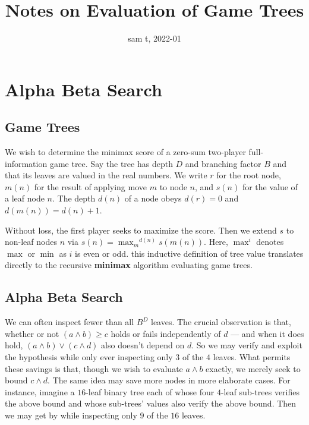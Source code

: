 \documentclass[12pt]{article}
\title{Notes on Evaluation of Game Trees}
\author{sam t, 2022-01}
\date{}
\begin{document}
  \maketitle

  \section{Alpha Beta Search}

    \subsection{Game Trees}

      We wish to determine the minimax score of a zero-sum two-player
      full-information game tree.  Say the tree has depth $D$ and branching
      factor $B$ and that its leaves are valued in the real numbers.  We write
      $r$ for the root node, $m(n)$ for the result of applying move $m$ to node
      $n$, and $s(n)$ for the value of a leaf node $n$.  The depth $d(n)$ of a
      node obeys $d(r)=0$ and $d(m(n))=d(n)+1$.

      Without loss, the first player seeks to maximize the score.  Then we
      extend $s$ to non-leaf nodes $n$ via $s(n) = {\max_m}^{d(n)} s(m(n))$.
      Here, $\max^{i}$ denotes $\max$ or $\min$ as $i$ is even or odd.  this
      inductive definition of tree value translates directly to the recursive
      \textbf{minimax} algorithm evaluating game trees.  

    \subsection{Alpha Beta Search}

      We can often inspect fewer than all $B^D$ leaves.  The crucial
      observation is that, whether or not $(a\wedge b) \geq c$ holds or fails
      independently of $d$ --- and when it does hold,
      $ 
          (a\wedge b) \vee (c\wedge d) 
      $
      also doesn't depend on $d$.  So we may verify and exploit the hypothesis
      while only ever inspecting only $3$ of the $4$ leaves.  
      What permits these savings is that, though we wish to evaluate $a\wedge
      b$ exactly, we merely seek to bound $c\wedge d$.
      The same idea may save more nodes in more elaborate cases.
      For instance, imagine a $16$-leaf binary tree each of whose four $4$-leaf
      sub-trees verifies the above bound and whose sub-trees' values also
      verify the above bound.  Then we may get by while inspecting only $9$ of
      the $16$ leaves.
\end{document}
